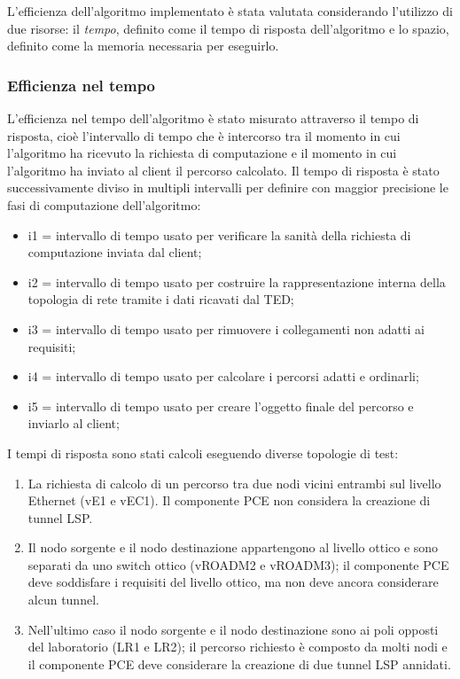 \documentclass[10pt,a4paper]{report}
\begin{document}
L'efficienza dell'algoritmo implementato è stata valutata
considerando l'utilizzo di due risorse: il \textit{tempo}, definito
come il tempo di risposta dell'algoritmo e lo spazio, definito come la
memoria necessaria per eseguirlo.

\subsubsection*{Efficienza nel tempo}

L'efficienza nel tempo dell'algoritmo è stato misurato attraverso il
tempo di risposta, cioè l'intervallo di tempo che è intercorso tra il
momento in cui l'algoritmo ha ricevuto la richiesta di computazione e
il momento in cui l'algoritmo ha inviato al client il percorso
calcolato. Il tempo di risposta è stato successivamente diviso in
multipli intervalli per definire con maggior precisione le fasi di
computazione dell'algoritmo:

\begin{itemize}
\item i1 = intervallo di tempo usato per verificare la sanità della
  richiesta di computazione inviata dal client;
\item i2 = intervallo di tempo usato per costruire la rappresentazione
  interna della topologia di rete tramite i dati ricavati dal TED;
\item i3 = intervallo di tempo usato per rimuovere i collegamenti non
  adatti ai requisiti;
\item i4 = intervallo di tempo usato per calcolare i percorsi adatti e ordinarli;
\item i5 = intervallo di tempo usato per creare l'oggetto finale del
  percorso e inviarlo al client;
\end{itemize}

I tempi di risposta sono stati calcoli eseguendo diverse topologie di
test:

\begin{enumerate}
\item La richiesta di calcolo di un percorso tra due nodi vicini
  entrambi sul livello Ethernet (vE1 e vEC1). Il componente PCE non
  considera la creazione di tunnel LSP.
\item Il nodo sorgente e il nodo destinazione appartengono al livello
  ottico e sono separati da uno switch ottico (vROADM2 e vROADM3); il
  componente PCE deve soddisfare i requisiti del livello ottico, ma
  non deve ancora considerare alcun tunnel.
\item Nell'ultimo caso il nodo sorgente e il nodo destinazione sono ai
  poli opposti del laboratorio (LR1 e LR2); il percorso richiesto è
  composto da molti nodi e il componente PCE deve considerare la
  creazione di due tunnel LSP annidati.
\end{enumerate}
\end{document}
